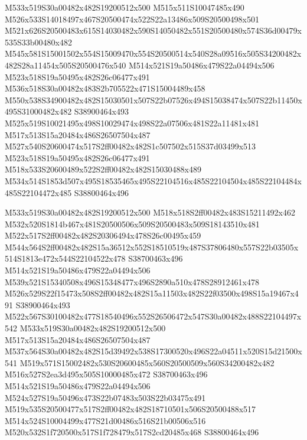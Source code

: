 \documentclass{article}
\begin{document}
\begin{multicols}{2}
M533x519S30a00482x482S19200512x500 M515x511S10047485x490 M526x533S14018497x467S20500474x522S22a13486x509S20500498x501 M521x626S20500483x615S14030482x590S14050482x551S20500480x574S36d00479x535S33b00480x482 M545x581S15001502x554S15009470x554S20500514x540S28a09516x505S34200482x482S28a11454x505S20500476x540 M514x521S19a50486x479S22a04494x506 M523x518S19a50495x482S26c06477x491 M536x518S30a00482x483S2b705522x471S15004489x458 M550x538S34900482x482S15030501x507S22b07526x494S15038474x507S22b11450x495S31000482x482 S38900464x493 M525x519S10021495x498S10029474x498S22a07506x481S22a11481x481 M517x513S15a20484x486S26507504x487 M527x540S20600474x517S2ff00482x482S1c507502x515S37d03499x513 M523x518S19a50495x482S26c06477x491 M518x533S20600489x522S2ff00482x482S15030488x489 M534x514S1853d507x495S18535465x495S22104516x485S22104504x485S22104484x485S22104472x485 S38800464x496

M533x519S30a00482x482S19200512x500 M518x518S2ff00482x483S15211492x462 M532x520S1814b467x481S20500506x509S20500483x509S18143510x481 M522x517S2ff00482x482S20306494x478S26c00495x459 M544x564S2ff00482x482S15a36512x552S18510519x487S37806480x557S22b03505x514S1813e472x544S22104522x478 S38700463x496 M514x521S19a50486x479S22a04494x506 M539x521S15340508x496S15348477x496S2890a510x478S28912461x478 M526x529S22f15473x508S2ff00482x482S15a11503x482S22f03500x498S15a19467x491 S38900464x493 M522x567S30100482x477S18540496x552S26506472x547S30a00482x488S22104497x542 M533x519S30a00482x482S19200512x500 M517x513S15a20484x486S26507504x487 M537x564S30a00482x482S15d39492x538S17300520x496S22a04511x520S15d21500x541 M519x571S15002482x530S20600485x560S20500509x560S34200482x482 M516x527S2ea3d495x505S10000485x472 S38700463x496 M514x521S19a50486x479S22a04494x506 M524x527S19a50496x473S22b07483x503S22b03475x491 M519x535S20500477x517S2ff00482x482S18710501x506S20500488x517 M514x524S10004499x477S21d00486x516S21b00506x516 M520x532S1f720500x517S1f728479x517S2cd20485x468 S38800464x496


\end{multicols}
\end{document}
